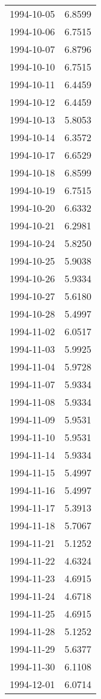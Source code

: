 \begin{tabular}{lr}
1994-10-05 &      6.8599 \\
1994-10-06 &      6.7515 \\
1994-10-07 &      6.8796 \\
1994-10-10 &      6.7515 \\
1994-10-11 &      6.4459 \\
1994-10-12 &      6.4459 \\
1994-10-13 &      5.8053 \\
1994-10-14 &      6.3572 \\
1994-10-17 &      6.6529 \\
1994-10-18 &      6.8599 \\
1994-10-19 &      6.7515 \\
1994-10-20 &      6.6332 \\
1994-10-21 &      6.2981 \\
1994-10-24 &      5.8250 \\
1994-10-25 &      5.9038 \\
1994-10-26 &      5.9334 \\
1994-10-27 &      5.6180 \\
1994-10-28 &      5.4997 \\
1994-11-02 &      6.0517 \\
1994-11-03 &      5.9925 \\
1994-11-04 &      5.9728 \\
1994-11-07 &      5.9334 \\
1994-11-08 &      5.9334 \\
1994-11-09 &      5.9531 \\
1994-11-10 &      5.9531 \\
1994-11-14 &      5.9334 \\
1994-11-15 &      5.4997 \\
1994-11-16 &      5.4997 \\
1994-11-17 &      5.3913 \\
1994-11-18 &      5.7067 \\
1994-11-21 &      5.1252 \\
1994-11-22 &      4.6324 \\
1994-11-23 &      4.6915 \\
1994-11-24 &      4.6718 \\
1994-11-25 &      4.6915 \\
1994-11-28 &      5.1252 \\
1994-11-29 &      5.6377 \\
1994-11-30 &      6.1108 \\
1994-12-01 &      6.0714 \\

\end{tabular}
